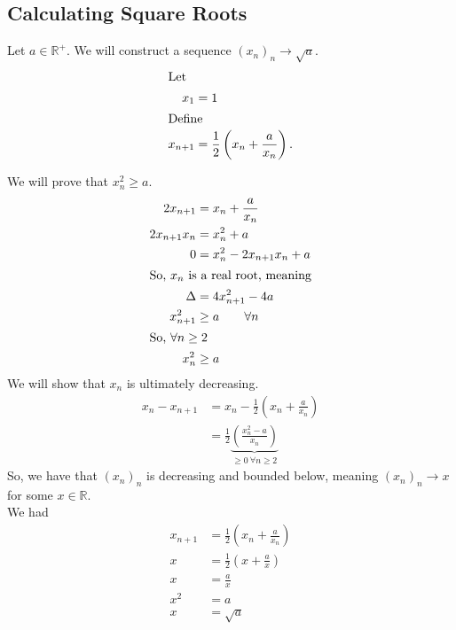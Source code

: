 \documentclass[10pt]{extarticle}
\newcommand{\R}{\mathbb{R}}
\begin{document}
  \subsection{Calculating Square Roots}%
    Let $a\in\R^+$. We will construct a sequence $\left(x_n\right)_n \rightarrow \sqrt{a}$.
    \begin{align*}
      \shortintertext{Let}
      x_{1} &= 1\\
      \shortintertext{Define}
      x_{n+1} &= \frac{1}{2}\left(x_{n} + \frac{a}{x_n}\right).
    \end{align*}

    We will prove that $x_{n}^2 \geq a$.
    \begin{align*}
      2x_{n+1} &= x_{n} + \frac{a}{x_n}\\
      2x_{n+1}x_n &= x_{n}^2 + a\\
      0 &= x_{n}^2 - 2x_{n+1}x_{n} + a\\
      \shortintertext{So, $x_{n}$ is a real root, meaning}
      \Delta &= 4x_{n+1}^2 - 4a\\
      x_{n+1}^2 &\geq a \tag*{$\forall n$}\\
      \shortintertext{So, $\forall n\geq 2$}
      x_{n}^2 &\geq a
    \end{align*}
    We will show that $x_n$ is ultimately decreasing.
    \begin{align*}
      x_n - x_{n+1} &= x_{n} - \frac{1}{2}\left(x_n + \frac{a}{x_n}\right)\\
                    &= \frac{1}{2}\underbrace{\left(\frac{x_n^2 - a}{x_n}\right)}_{\geq 0~\forall n\geq 2}
    \end{align*}
    So, we have that $\left(x_n\right)_n$ is decreasing and bounded below, meaning $(x_n)_n \rightarrow x$ for some $x\in\R$.\\

    We had
    \begin{align*}
      x_{n+1} &= \frac{1}{2}\left(x_n + \frac{a}{x_n}\right)\\
      x &= \frac{1}{2}\left(x + \frac{a}{x}\right)\\
      x &= \frac{a}{x}\\
      x^2 &= a\\
      x &= \sqrt{a} \tag*{remember that $x > 0$}
    \end{align*}
\end{document}

